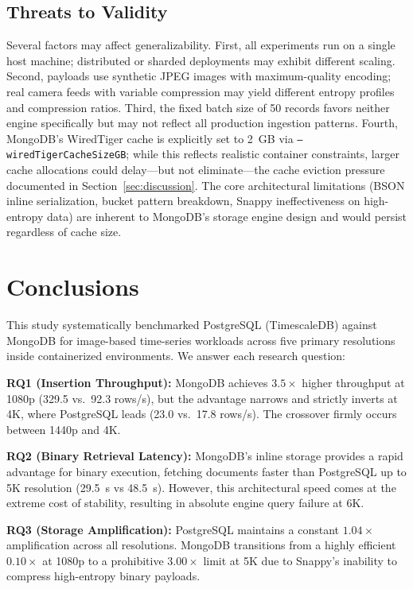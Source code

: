 \documentclass[conference, a4paper]{IEEEtran}
\begin{document}
\subsection{Threats to Validity}
Several factors may affect generalizability. First, all experiments run on a single host machine; distributed or sharded deployments may exhibit different scaling. Second, payloads use synthetic JPEG images with maximum-quality encoding; real camera feeds with variable compression may yield different entropy profiles and compression ratios. Third, the fixed batch size of 50 records favors neither engine specifically but may not reflect all production ingestion patterns. Fourth, MongoDB's WiredTiger cache is explicitly set to 2~GB via \texttt{--wiredTigerCacheSizeGB}; while this reflects realistic container constraints, larger cache allocations could delay---but not eliminate---the cache eviction pressure documented in Section~\ref{sec:discussion}. The core architectural limitations (BSON inline serialization, bucket pattern breakdown, Snappy ineffectiveness on high-entropy data) are inherent to MongoDB's storage engine design and would persist regardless of cache size.

\section{Conclusions}
\label{sec:conclusions}

This study systematically benchmarked PostgreSQL (TimescaleDB) against MongoDB for image-based time-series workloads across five primary resolutions inside containerized environments. We answer each research question:

\textbf{RQ1 (Insertion Throughput):} MongoDB achieves $3.5\times$ higher throughput at 1080p (329.5 vs.\ 92.3 rows/s), but the advantage narrows and strictly inverts at 4K, where PostgreSQL leads (23.0 vs.\ 17.8 rows/s). The crossover firmly occurs between 1440p and 4K.

\textbf{RQ2 (Binary Retrieval Latency):} MongoDB's inline storage provides a rapid advantage for binary execution, fetching documents faster than PostgreSQL up to 5K resolution (29.5~s vs 48.5~s). However, this architectural speed comes at the extreme cost of stability, resulting in absolute engine query failure at 6K.

\textbf{RQ3 (Storage Amplification):} PostgreSQL maintains a constant $1.04\times$ amplification across all resolutions. MongoDB transitions from a highly efficient $0.10\times$ at 1080p to a prohibitive $3.00\times$ limit at 5K due to Snappy's inability to compress high-entropy binary payloads.
\end{document}
